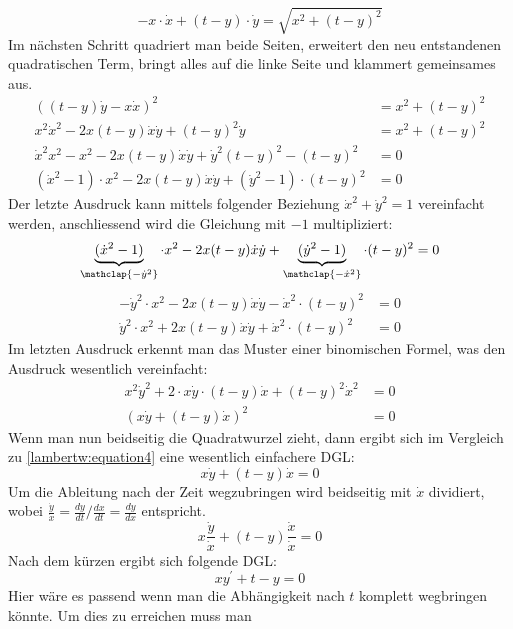\begin{equation}
		-x \cdot \dot{x} + (t-y) \cdot \dot{y}
		= \sqrt{x^2 + (t-y)^2}
		\label{lambertw:equation4}
\end{equation}
Im nächsten Schritt quadriert man beide Seiten, erweitert den neu entstandenen quadratischen Term, bringt alles auf die linke Seite und klammert gemeinsames aus.
\begin{align*}
	((t-y) \dot{y} - x \dot{x})^2
	&= x^2 + (t-y)^2 \\
	x^2 \dot{x}^2 - 2x(t-y) \dot{x} \dot{y} + (t-y)^2 \dot{y}
	&= x^2 + (t-y)^2 \\
	\dot{x}^2 x^2 - x^2 - 2x(t-y) \dot{x} \dot{y} + \dot{y}^2 (t-y)^2 - (t-y)^2
	&= 0 \\
	(\dot{x}^2 - 1) \cdot x^2 - 2x(t-y) \dot{x} \dot{y} + (\dot{y}^2 - 1) \cdot (t-y)^2
	&= 0
\end{align*}
Der letzte Ausdruck kann mittels folgender Beziehung \(\dot{x}^2 + \dot{y}^2 = 1\) vereinfacht werden, anschliessend wird die Gleichung mit \(-1\) multipliziert:
\[
	\underbrace{(\dot{x}^2 - 1)}_{\mathclap{-\dot{y}^2}} \cdot x^2 - 2x(t-y) \dot{x} \dot{y} + \underbrace{(\dot{y}^2 - 1)}_{\mathclap{-\dot{x}^2}} \cdot (t-y)^2
	= 0
\]
\begin{align*}
	- \dot{y}^2 \cdot x^2 - 2x(t-y) \dot{x} \dot{y} - \dot{x}^2 \cdot (t-y)^2
	&= 0 \\
	\dot{y}^2 \cdot x^2 + 2x(t-y) \dot{x} \dot{y} + \dot{x}^2 \cdot (t-y)^2
	&= 0
\end{align*}
Im letzten Ausdruck erkennt man das Muster einer binomischen Formel, was den Ausdruck wesentlich vereinfacht:
\begin{align*}
	x^2 \dot{y}^2  + 2 \cdot x \dot{y} \cdot (t-y) \dot{x}  + (t-y)^2 \dot{x}^2
	&= 0 \\
	(x \dot{y} + (t-y) \dot{x})^2
	&= 0
\end{align*}
Wenn man nun beidseitig die Quadratwurzel zieht, dann ergibt sich im Vergleich zu \eqref{lambertw:equation4} eine wesentlich einfachere DGL:
\begin{equation}
	x \dot{y} + (t-y) \dot{x}
	= 0
	\label{lambertw:equation5}
\end{equation}
Um die Ableitung nach der Zeit wegzubringen wird beidseitig mit \(\dot{x}\) dividiert, wobei \(\frac{\dot{y}}{\dot{x}} = \frac{dy}{dt}/\frac{dx}{dt} = \frac{dy}{dx}\) entspricht.
\[
	x \frac{\dot{y}}{\dot{x}} + (t-y) \frac{\dot{x}}{\dot{x}}
	= 0
\]
Nach dem kürzen ergibt sich folgende DGL:
\begin{equation}
	x y^{\prime} + t - y
	= 0
	\label{lambertw:equation6}
\end{equation}
Hier wäre es passend wenn man die Abhängigkeit nach \(t\) komplett wegbringen könnte. Um dies zu erreichen muss man 


